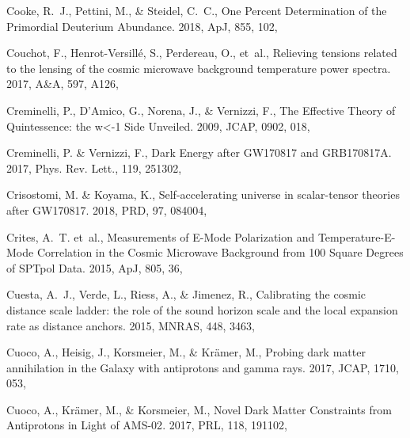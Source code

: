 \documentclass[longauth,traditabstract]{aa}
\def\aap{{A\&A}}
\def\apj{{ApJ}}
\def\mnras{{MNRAS}}
\def\prd{{PRD}}
\def\prl{{PRL}}
\def\jcap{{JCAP}}
\begin{document}
\begin{thebibliography}{379}
Cooke, R.~J., Pettini, M., \& Steidel, C.~C., {One Percent Determination of the
  Primordial Deuterium Abundance}. 2018, \apj, 855, 102, 

Couchot, F., Henrot-Versillé, S., Perdereau, O., {et~al.}, {Relieving tensions
  related to the lensing of the cosmic microwave background temperature power
  spectra}. 2017, \aap, 597, A126, 

Creminelli, P., D'Amico, G., Norena, J., \& Vernizzi, F., {The Effective Theory
  of Quintessence: the w<-1 Side Unveiled}. 2009, JCAP, 0902, 018,

Creminelli, P. \& Vernizzi, F., {Dark Energy after GW170817 and GRB170817A}.
  2017, Phys. Rev. Lett., 119, 251302, 

{Crisostomi}, M. \& {Koyama}, K., {Self-accelerating universe in scalar-tensor
  theories after GW170817}. 2018, \prd, 97, 084004, 

Crites, A.~T. {et~al.}, {Measurements of E-Mode Polarization and
  Temperature-E-Mode Correlation in the Cosmic Microwave Background from 100
  Square Degrees of SPTpol Data}. 2015, \apj, 805, 36, 

Cuesta, A.~J., Verde, L., Riess, A., \& Jimenez, R., {Calibrating the cosmic
  distance scale ladder: the role of the sound horizon scale and the local
  expansion rate as distance anchors}. 2015, \mnras, 448, 3463,

Cuoco, A., Heisig, J., Korsmeier, M., \& Krämer, M., {Probing dark matter
  annihilation in the Galaxy with antiprotons and gamma rays}.
  2017{}, \jcap, 1710, 053, 

Cuoco, A., Krämer, M., \& Korsmeier, M., {Novel Dark Matter Constraints from
  Antiprotons in Light of AMS-02}. 2017{}, \prl, 118, 191102,


\end{thebibliography}
\end{document}
